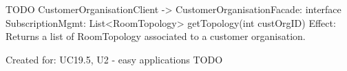                           TODO
                      CustomerOrganisationClient -> CustomerOrganisationFacade: interface SubscriptionMgmt: List<RoomTopology> getTopology(int custOrgID)
                          Effect: Returns a list of RoomTopology associated to a customer organisation.
                          \item Created for: UC19.5, U2 - easy applications
                          TODO
